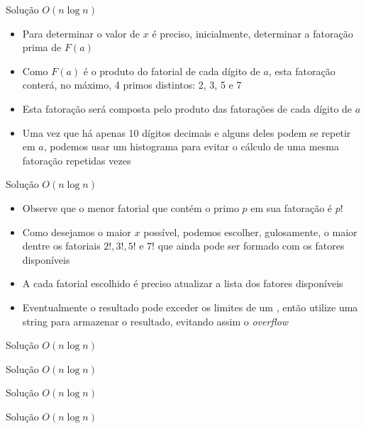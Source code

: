 \begin{frame}[fragile]{Solução $O(n\log n)$}

    \begin{itemize}
        \item Para determinar o valor de $x$ é preciso, inicialmente, determinar a fatoração
            prima de $F(a)$

        \item Como $F(a)$ é o produto do fatorial de cada dígito de $a$, esta fatoração conterá,
            no máximo, 4 primos distintos: 2, 3, 5 e 7

        \item Esta fatoração será composta pelo produto das fatorações de cada dígito de $a$

        \item Uma vez que há apenas 10 dígitos decimais e alguns deles podem se repetir em
            $a$, podemos usar um histograma para evitar o cálculo de uma mesma fatoração
            repetidas vezes
    \end{itemize}

\end{frame}

\begin{frame}[fragile]{Solução $O(n\log n)$}

    \begin{itemize}
        \item Observe que o menor fatorial que contém o primo $p$ em sua fatoração é $p!$

        \item Como desejamos o maior $x$ possível, podemos escolher, gulosamente, o maior
            dentre os fatoriais $2!, 3!, 5!$ e $7!$ que ainda pode ser formado com os fatores
            disponíveis

        \item A cada fatorial escolhido é preciso atualizar a lista dos fatores disponíveis

        \item Eventualmente o resultado pode exceder os limites de um ,
            então utilize uma string para armazenar o resultado, evitando assim o \textit{overflow}
    \end{itemize}

\end{frame}

\begin{frame}[fragile]{Solução $O(n\log n)$}
\end{frame}

\begin{frame}[fragile]{Solução $O(n\log n)$}
\end{frame}

\begin{frame}[fragile]{Solução $O(n\log n)$}
\end{frame}

\begin{frame}[fragile]{Solução $O(n\log n)$}
\end{frame}
